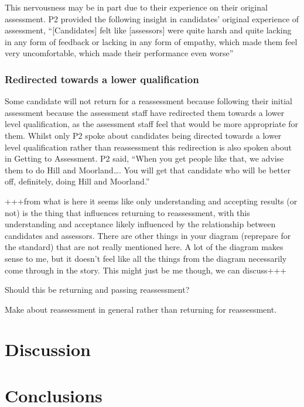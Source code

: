\documentclass[a4paper,]{book}
\begin{document}
This nervousness may be in part due to their experience on their original assessment. P2 provided the following insight in candidates' original experience of assessment, ``{[}Candidates{]} felt like {[}assessors{]} were quite harsh and quite lacking in any form of feedback or lacking in any form of empathy, which made them feel very uncomfortable, which made their performance even worse''

\hypertarget{redirected-towards-a-lower-qualification}{%
\subsubsection{Redirected towards a lower qualification}\label{redirected-towards-a-lower-qualification}}

Some candidate will not return for a reassessment because following their initial assessment because the assessment staff have redirected them towards a lower level qualification, as the assessment staff feel that would be more appropriate for them. Whilst only P2 spoke about candidates being directed towards a lower level qualification rather than reassessment this redirection is also spoken about in Getting to Assessment. P2 said, ``When you get people like that, we advise them to do Hill and Moorland\ldots{}. You will get that candidate who will be better off, definitely, doing Hill and Moorland.''

+++from what is here it seems like only understanding and accepting results (or not) is the thing that influences returning to reassessment, with this understanding and acceptance likely influenced by the relationship between candidates and assessors. There are other things in your diagram (reprepare for the standard) that are not really mentioned here. A lot of the diagram makes sense to me, but it doesn't feel like all the things from the diagram necessarily come through in the story. This might just be me though, we can discuss+++

Should this be returning and passing reassessment?

Make about reassessment in general rather than returning for reassessment.

\hypertarget{discussion}{%
\section{Discussion}\label{discussion}}

\hypertarget{conclusions}{%
\section{Conclusions}\label{conclusions}}
\end{document}
